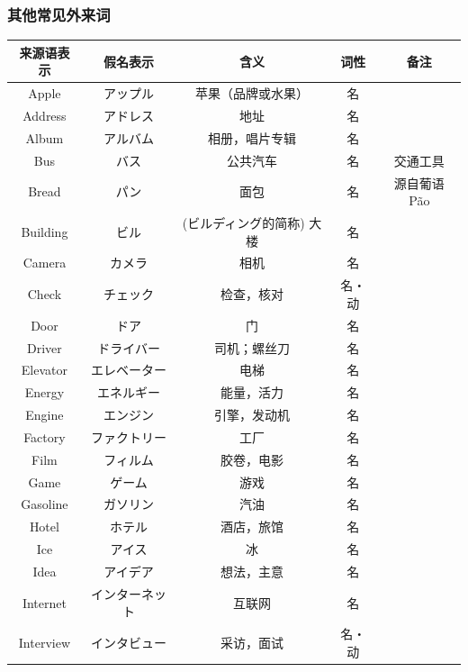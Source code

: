 \subsubsection{其他常见外来词}
\begin{longtable}{|c|c|c|c|c|}
    \hline
来源语表示 & 假名表示  & 含义 & 词性 & 备注 \\ \hline\hline   
    Apple & アップル & 苹果（品牌或水果） & 名 & \\ \hline
    Address & アドレス & 地址 & 名 & \\ \hline
    Album & アルバム & 相册，唱片专辑 & 名 & \\ \hline
    
    Bus & バス & 公共汽车 & 名 & 交通工具 \\ \hline
    Bread & パン & 面包 & 名 & 源自葡语 Pão \\ \hline
    Building & ビル & (ビルディング的简称) 大楼 & 名 & \\ \hline
        
    Camera & カメラ & 相机 & 名 & \\ \hline
    Check & チェック & 检查，核对 & 名・动 & \\ \hline
    
    Door & ドア & 门 & 名 & \\ \hline
    Driver & ドライバー & 司机；螺丝刀 & 名 & \\ \hline
    
    Elevator & エレベーター & 电梯 & 名 & \\ \hline
    Energy & エネルギー & 能量，活力 & 名 &  \\ \hline
    Engine & エンジン & 引擎，发动机 & 名 & \\ \hline
    
    Factory & ファクトリー & 工厂 & 名 & \\ \hline
    Film & フィルム & 胶卷，电影 & 名 & \\ \hline
    
    Game & ゲーム & 游戏 & 名 &  \\ \hline
    Gasoline & ガソリン & 汽油 & 名 & \\ \hline
    
    Hotel & ホテル & 酒店，旅馆 & 名 &  \\ \hline
    Ice & アイス & 冰 & 名 & \\ \hline
    Idea & アイデア & 想法，主意 & 名 & \\ \hline
    Internet & インターネット & 互联网 & 名 & \\ \hline
    Interview & インタビュー & 采访，面试 & 名・动 & \\ \hline
    

\end{longtable}
